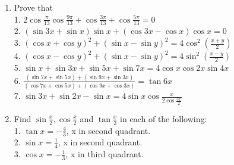\begin{enumerate}[label=\arabic*]
\item Prove that\\
1. 2$\cos\frac{\pi}{13}\cos\frac{9\pi}{13}+\cos\frac{3\pi}{13}+\cos\frac{5\pi}{13}=0$\\
2. $(\sin3x+\sin x)\sin x+(\cos3x-\cos x)\cos x=0$\\
3. $(\cos x+\cos y)^{2}+(\sin x-\sin y)^{2}=4\cos^{2}(\frac{x+y}{2})$\\
4. $(\cos x-\cos y)^{2}+(\sin x-\sin y)^{2}=4\sin^{2}(\frac{x-y}{2})$\\
5. $\sin x+\sin3x+\sin5x+\sin7x=4\cos x\cos2x\sin4x$\\
6. $\frac{(\sin7x+\sin5x)+(\sin9x+\sin3x)}{(\cos7x+\cos5x)+(\cos9x+\cos3x)}=\tan6x$\\
7. $\sin3x+\sin2x-\sin x=4\sin x\cos\frac{x}{2\cos\frac{3x}{2}}$\\

\item Find $\sin\frac{x}{2},\cos\frac{x}{2}$ and $\tan\frac{x}{2}$ in each of the following:\\
1. $\tan x=-\frac{4}{3}$, x in second quadrant. \\
2. $\sin x=\frac{1}{4}$, x in second quadrant.\\
3. $\cos x=-\frac{1}{3}$, x in third quadrant.\\
    
\end{enumerate}
    
